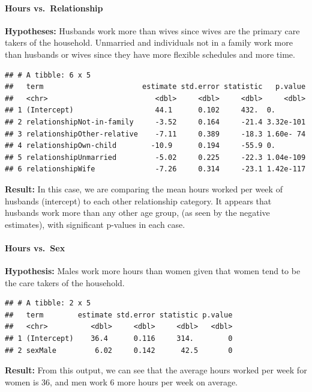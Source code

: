 \documentclass[]{article}
\let\oldparagraph\paragraph
\renewcommand{\paragraph}[1]{\oldparagraph{#1}\mbox{}}
\begin{document}
\hypertarget{hours-vs.-relationship}{%
\paragraph{Hours vs.~Relationship}\label{hours-vs.-relationship}}

\textbf{Hypotheses:} Husbands work more than wives since wives are the
primary care takers of the household. Unmarried and individuals not in a
family work more than husbands or wives since they have more flexible
schedules and more time.

\begin{verbatim}
## # A tibble: 6 x 5
##   term                       estimate std.error statistic   p.value
##   <chr>                         <dbl>     <dbl>     <dbl>     <dbl>
## 1 (Intercept)                   44.1      0.102     432.  0.       
## 2 relationshipNot-in-family     -3.52     0.164     -21.4 3.32e-101
## 3 relationshipOther-relative    -7.11     0.389     -18.3 1.60e- 74
## 4 relationshipOwn-child        -10.9      0.194     -55.9 0.       
## 5 relationshipUnmarried         -5.02     0.225     -22.3 1.04e-109
## 6 relationshipWife              -7.26     0.314     -23.1 1.42e-117
\end{verbatim}

\textbf{Result:} In this case, we are comparing the mean hours worked
per week of husbands (intercept) to each other relationship category. It
appears that husbands work more than any other age group, (as seen by
the negative estimates), with significant p-values in each case.

\hypertarget{hours-vs.-sex}{%
\paragraph{Hours vs.~Sex}\label{hours-vs.-sex}}

\textbf{Hypothesis:} Males work more hours than women given that women
tend to be the care takers of the household.

\begin{verbatim}
## # A tibble: 2 x 5
##   term        estimate std.error statistic p.value
##   <chr>          <dbl>     <dbl>     <dbl>   <dbl>
## 1 (Intercept)    36.4      0.116     314.        0
## 2 sexMale         6.02     0.142      42.5       0
\end{verbatim}

\textbf{Result:} From this output, we can see that the average hours
worked per week for women is 36, and men work 6 more hours per week on
average.
\end{document}
